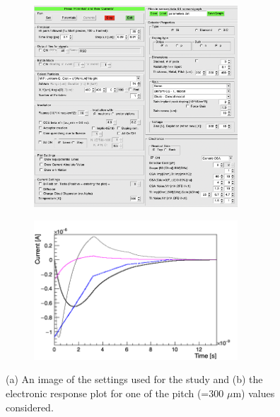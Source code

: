 \documentclass[11pt]{article}
\begin{document}
\begin{figure}[h!]
    \centering
    \begin{subfigure}[t]{0.49\textwidth}
        \centering
        \includegraphics[width=3in]{Images/varying_pitch_other_settings.png}
        \caption{}
        \label{fig:varying_pitch_other_settings}
    \end{subfigure}%
    \begin{subfigure}[t]{0.49\textwidth}
        \centering
        \includegraphics[width=3in]{Images/varying_pitch_300umcase_plot.png}
        \caption{}
        \label{fig:varying_pitch_plot}
    \end{subfigure}
    \caption{(a) An image of the settings used for the study and (b) the electronic response plot for one of the pitch (=300 $\mu$m) values considered.}
    \label{fig:varying_pitch}
\end{figure}
\end{document}
